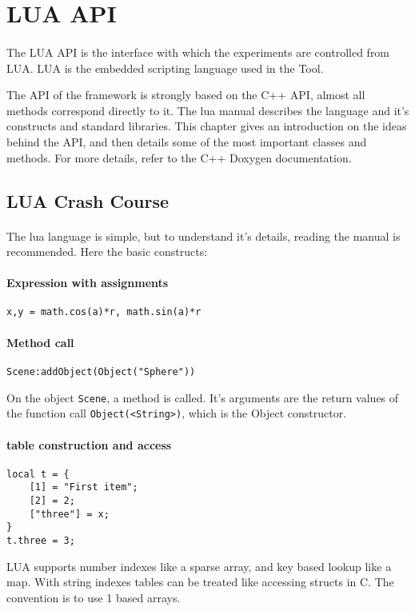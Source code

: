 \section{LUA API}
\paragraph{}
The LUA API is the interface with which the experiments are controlled from LUA.
LUA is the embedded scripting language used in the Tool.

The API of the framework is strongly based on the C++ API, almost all methods correspond directly to it.
The lua manual\cite{lua} describes the language and it's constructs and standard libraries.
This chapter gives an introduction on the ideas behind the API, and then details some of the most important classes and methods. For more details, refer to the C++ Doxygen documentation.


\subsection{LUA Crash Course}
\paragraph{}
The lua language is simple, but to understand it's details, reading the manual\cite{lua} is recommended.
Here the basic constructs:

\paragraph{Expression with assignments}
\begin{verbatim}
x,y = math.cos(a)*r, math.sin(a)*r
\end{verbatim}

\paragraph{Method call}
\begin{verbatim}
Scene:addObject(Object("Sphere"))
\end{verbatim}
On the object  \texttt{Scene}, a method is called. It's arguments are the return values of the function call \texttt{Object(<String>)}, which is the Object constructor.

\paragraph{table construction and access}
\begin{verbatim}
local t = {
    [1] = "First item";
    [2] = 2;
    ["three"] = x;
}
t.three = 3;
\end{verbatim}
LUA supports number indexes like a sparse array, and key based lookup like a map.
With string indexes tables can be treated like accessing structs in C.
The convention is to use 1 based arrays.

